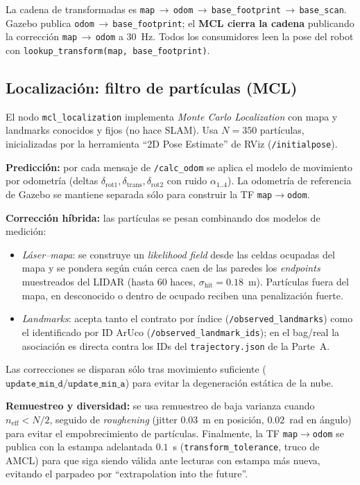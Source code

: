 La cadena de transformadas es \texttt{map}\,$\to$\,\allowbreak\texttt{odom}\,$\to$\,\allowbreak\texttt{base\_footprint}\,$\to$\,\allowbreak\texttt{base\_scan}. Gazebo publica \texttt{odom}\,$\to$\,\texttt{base\_footprint}; el \textbf{MCL cierra la cadena} publicando la corrección \texttt{map}\,$\to$\,\texttt{odom} a 30~Hz. Todos los consumidores leen la pose del robot con \texttt{lookup\_transform(map, base\_footprint)}.

\subsection{Localización: filtro de partículas (MCL)}
El nodo \texttt{mcl\_localization} implementa \emph{Monte Carlo Localization} \cite{amcl} con mapa y landmarks conocidos y fijos (no hace SLAM). Usa $N=350$ partículas, inicializadas por la herramienta ``2D Pose Estimate'' de RViz (\texttt{/initialpose}).

\textbf{Predicción:} por cada mensaje de \texttt{/calc\_odom} se aplica el modelo de movimiento por odometría (deltas $\delta_{\text{rot1}},\delta_{\text{trans}},\delta_{\text{rot2}}$ con ruido $\alpha_{1..4}$). La odometría de referencia de Gazebo se mantiene separada sólo para construir la TF \texttt{map$\to$odom}.

\textbf{Corrección híbrida:} las partículas se pesan combinando dos modelos de medición:
\begin{itemize}
\item \emph{Láser--mapa}: se construye un \emph{likelihood field} desde las celdas ocupadas del mapa y se pondera según cuán cerca caen de las paredes los \emph{endpoints} muestreados del LIDAR (hasta 60 haces, $\sigma_{\text{hit}}=0.18$~m). Partículas fuera del mapa, en desconocido o dentro de ocupado reciben una penalización fuerte.
\item \emph{Landmarks}: acepta tanto el contrato por índice (\texttt{/observed\_landmarks}) como el identificado por ID ArUco (\texttt{/observed\_landmark\_ids}); en el bag/real la asociación es directa contra los IDs del \texttt{trajectory.json} de la Parte~A.
\end{itemize}
Las correcciones se disparan sólo tras movimiento suficiente ($\texttt{update\_min\_d}/\texttt{update\_min\_a}$) para evitar la degeneración estática de la nube.

\textbf{Remuestreo y diversidad:} se usa remuestreo de baja varianza cuando $n_{\text{eff}}<N/2$, seguido de \emph{roughening} (jitter $0.03$~m en posición, $0.02$~rad en ángulo) para evitar el empobrecimiento de partículas. Finalmente, la TF \texttt{map$\to$odom} se publica con la estampa adelantada $0.1$~s (\texttt{transform\_tolerance}, truco de AMCL) para que siga siendo válida ante lecturas con estampa más nueva, evitando el parpadeo por ``extrapolation into the future''.

